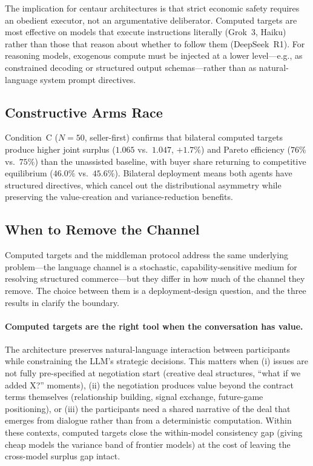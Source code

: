 \documentclass[11pt,a4paper]{article}
\begin{document}
The implication for centaur architectures is that strict economic safety requires an obedient executor, not an argumentative deliberator. Computed targets are most effective on models that execute instructions literally (Grok~3, Haiku) rather than those that reason about whether to follow them (DeepSeek~R1). For reasoning models, exogenous compute must be injected at a lower level---e.g., as constrained decoding or structured output schemas---rather than as natural-language system prompt directives.

\subsection{Constructive Arms Race}

Condition~C ($N = 50$, seller-first) confirms that bilateral computed targets produce higher joint surplus ($1.065$ vs.\ $1.047$, $+1.7\%$) and Pareto efficiency ($76\%$ vs.\ $75\%$) than the unassisted baseline, with buyer share returning to competitive equilibrium ($46.0\%$ vs.\ $45.6\%$). Bilateral deployment means both agents have structured directives, which cancel out the distributional asymmetry while preserving the value-creation and variance-reduction benefits.

\subsection{When to Remove the Channel}
\label{sec:tool_selection}

Computed targets and the middleman protocol address the same underlying problem---the language channel is a stochastic, capability-sensitive medium for resolving structured commerce---but they differ in how much of the channel they remove. The choice between them is a deployment-design question, and the three results in  clarify the boundary.

\paragraph{Computed targets are the right tool when the conversation has value.} The architecture preserves natural-language interaction between participants while constraining the LLM's strategic decisions. This matters when (i) issues are not fully pre-specified at negotiation start (creative deal structures, ``what if we added X?'' moments), (ii) the negotiation produces value beyond the contract terms themselves (relationship building, signal exchange, future-game positioning), or (iii) the participants need a shared narrative of the deal that emerges from dialogue rather than from a deterministic computation. Within these contexts, computed targets close the within-model consistency gap (giving cheap models the variance band of frontier models) at the cost of leaving the cross-model surplus gap intact.
\end{document}
